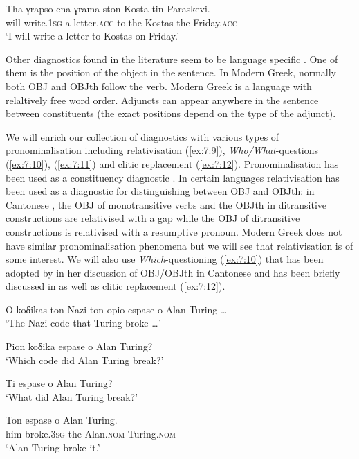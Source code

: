 \documentclass[output=paper]{langsci/langscibook}
\begin{document}
\ea%
    \label{ex:7:8}
\gll Tha γrapso ena γrama ston Kosta tin Paraskevi.\\
          will write.\textsc{1sg}   a  letter.\textsc{acc} to.the Kostas the  Friday.\textsc{acc}\\
\glt `I will write a letter to Kostas on Friday.'
\z

Other diagnostics found in the literature seem to be language specific \citep{lam2008}. One of them is the position of the object in the sentence. In Modern Greek, normally both OBJ and OBJth follow the verb. Modern Greek is a language with relaltively free word order. Adjuncts can appear anywhere in the sentence between constituents (the exact positions depend on the type of the adjunct).

We will enrich our collection of diagnostics with various types of pronominalisation \citep{radford1988} including relativisation (\ref{ex:7:9}), \textit{Who/What}-questions (\ref{ex:7:10}), (\ref{ex:7:11}) and clitic replacement (\ref{ex:7:12}). Pronominalisation has been used as a constituency diagnostic \citep{radford1988}. In certain languages relativisation has been used as a diagnostic for distinguishing between OBJ and OBJth: in Cantonese \citep{lam2008}, the OBJ of monotransitive verbs and the OBJth in ditransitive constructions are relativised with a gap while the OBJ of ditransitive constructions is relativised with a resumptive pronoun. Modern Greek does not have similar pronominalisation phenomena but we will see that  relativisation is of some interest.  We will also use \textit{Which}-questioning (\ref{ex:7:10}) that has been adopted by \citet{lam2008} in her discussion of OBJ/OBJth in Cantonese and has been briefly discussed in \citet{kaysagidioms} as well as clitic replacement (\ref{ex:7:12}). 

\ea
\label{ex:7:9}
\gln O koδikas ton Nazi ton opio espase o Alan Turing \ldots\\
\glt `The Nazi code that Turing broke \ldots'
\z

\ea%
    \label{ex:7:10}
\gln Pion koδika espase o Alan Turing?\\
\glt `Which code did Alan Turing break?'
\z

\ea%
\label{ex:7:11}
\gln  Ti espase o Alan Turing?\\
\glt `What did Alan Turing break?'
\z

\ea%
    \label{ex:7:12}
\gll  Ton espase o Alan Turing.\\
     him broke.\textsc{3sg} the Alan.\textsc{nom} Turing.\textsc{nom}\\
\glt `Alan Turing broke it.'
\z
\end{document}
